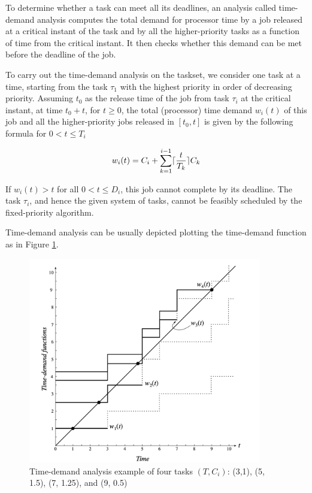 \documentclass{article}
\begin{document}
To determine whether a task can meet all its deadlines, an analysis called time-demand analysis computes the total demand for processor time by a job released at a critical instant of the task and by all the higher-priority tasks as a function of time from the critical instant. It then checks whether this demand can be met before the deadline of the job.

To carry out the time-demand analysis on the taskset, we consider one task at a time, starting from the task $\tau_1$ with the highest priority in order of decreasing priority.
Assuming $t_0$ as the release time of the job from task $\tau_i$ at the critical instant, at time $t_0 + t$, for $t \ge 0$, the total (processor) time demand $w_i(t)$ of this job and all the higher-priority jobs released in $[t_0, t]$ is given by the following formula for $0 < t \le T_i$

$$
w_i(t) = C_i + \sum_{k=1}^{i-1} \lceil {t \over T_k} \rceil C_k
$$

If $w_i(t) > t$ for all $0 < t \le D_i$, this job cannot complete by its deadline. The task $\tau_i$, and hence the given system of tasks, cannot be feasibly scheduled by the fixed-priority algorithm.

Time-demand analysis can be usually depicted plotting the time-demand function as in Figure \ref{time-demand}.

\begin{figure}[!htbp]
\centering
\includegraphics[width=4in]{images/time-demand}
\caption{Time-demand analysis example of four tasks $(T, C_i)$: (3,1), (5, 1.5), (7, 1.25), and (9, 0.5) \cite{rm-dm}}
\label{time-demand}
\end{figure}
\end{document}
